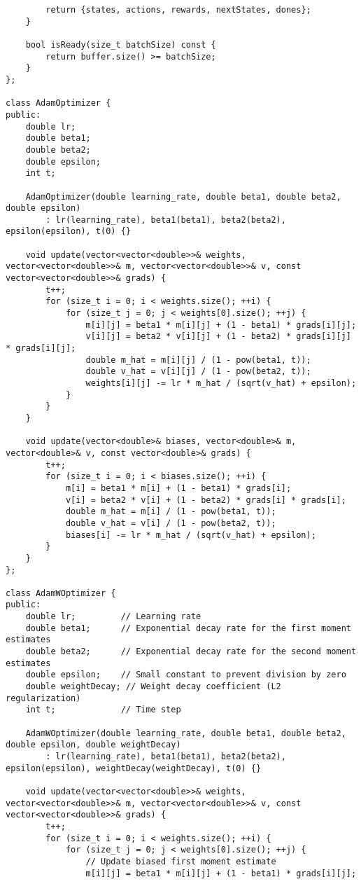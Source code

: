 \begin{verbatim}
        return {states, actions, rewards, nextStates, dones};
    }
 
    bool isReady(size_t batchSize) const {
        return buffer.size() >= batchSize;
    }
};
 
class AdamOptimizer {
public:
    double lr;
    double beta1;
    double beta2;
    double epsilon;
    int t;
 
    AdamOptimizer(double learning_rate, double beta1, double beta2, double epsilon)
        : lr(learning_rate), beta1(beta1), beta2(beta2), epsilon(epsilon), t(0) {}
 
    void update(vector<vector<double>>& weights, vector<vector<double>>& m, vector<vector<double>>& v, const vector<vector<double>>& grads) {
        t++;
        for (size_t i = 0; i < weights.size(); ++i) {
            for (size_t j = 0; j < weights[0].size(); ++j) {
                m[i][j] = beta1 * m[i][j] + (1 - beta1) * grads[i][j];
                v[i][j] = beta2 * v[i][j] + (1 - beta2) * grads[i][j] * grads[i][j];
                double m_hat = m[i][j] / (1 - pow(beta1, t));
                double v_hat = v[i][j] / (1 - pow(beta2, t));
                weights[i][j] -= lr * m_hat / (sqrt(v_hat) + epsilon);
            }
        }
    }
 
    void update(vector<double>& biases, vector<double>& m, vector<double>& v, const vector<double>& grads) {
        t++;
        for (size_t i = 0; i < biases.size(); ++i) {
            m[i] = beta1 * m[i] + (1 - beta1) * grads[i];
            v[i] = beta2 * v[i] + (1 - beta2) * grads[i] * grads[i];
            double m_hat = m[i] / (1 - pow(beta1, t));
            double v_hat = v[i] / (1 - pow(beta2, t));
            biases[i] -= lr * m_hat / (sqrt(v_hat) + epsilon);
        }
    }
};
 
class AdamWOptimizer {
public:
    double lr;         // Learning rate
    double beta1;      // Exponential decay rate for the first moment estimates
    double beta2;      // Exponential decay rate for the second moment estimates
    double epsilon;    // Small constant to prevent division by zero
    double weightDecay; // Weight decay coefficient (L2 regularization)
    int t;             // Time step
 
    AdamWOptimizer(double learning_rate, double beta1, double beta2, double epsilon, double weightDecay)
        : lr(learning_rate), beta1(beta1), beta2(beta2), epsilon(epsilon), weightDecay(weightDecay), t(0) {}
 
    void update(vector<vector<double>>& weights, vector<vector<double>>& m, vector<vector<double>>& v, const vector<vector<double>>& grads) {
        t++;
        for (size_t i = 0; i < weights.size(); ++i) {
            for (size_t j = 0; j < weights[0].size(); ++j) {
                // Update biased first moment estimate
                m[i][j] = beta1 * m[i][j] + (1 - beta1) * grads[i][j];
 

\end{verbatim}
